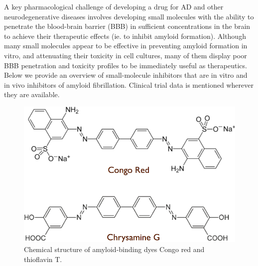 A key pharmacological challenge of developing a drug for AD and other neurodegenerative diseases involves developing small molecules with the ability to penetrate the blood-brain barrier (BBB) in sufficient concentrations in the brain to achieve their therapeutic effects (ie. to inhibit amyloid formation). Although many small molecules appear to be effective in preventing amyloid formation in vitro, and attenuating their toxicity in cell cultures, many of them display poor BBB penetration and toxicity profiles to be immediately useful as therapeutics.
Below we provide an overview of small-molecule inhibitors that are in vitro and in vivo inhibitors of amyloid fibrillation.  Clinical trial data is mentioned wherever they are available.

\begin{figure}
\centering
\includegraphics[width=4.5in]{figures/introduction/dyes.pdf}
\caption[Amyloid-binding dyes]{Chemical structure of amyloid-binding dyes Congo red and thioflavin T.}
\label{fig:amyloid_dyes}
\end{figure}


